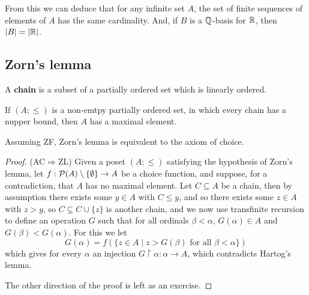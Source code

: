 \documentclass{article}
\begin{document}
From this we can deduce that for any infinite set $A$, the set of finite sequences of elements of $A$ has the same cardinality. And, if $B$ is a $\mathbb{Q}$-basis for $\mathbb{R}$, then $\left| B \right|=\left| \mathbb{R} \right|$.

\subsection{Zorn's lemma}

\begin{definition}
    A \textbf{chain} is a subset of a partially ordered set which is linearly ordered.
\end{definition}

\begin{axiom}
    If $(A;\leq)$ is a non-emtpy partially ordered set, in which every chain has a nupper bound, then $A$ has a maximal element.
\end{axiom}

\begin{theorem}
    Assuming ZF, Zorn's lemma is equivalent to the axiom of choice.
    \begin{proof}
        (AC$\Rightarrow$ZL) Given a poset $(A;\leq)$ satisfying the hypothesis of Zorn's lemma, let $f:\mathcal{P}(A)\setminus\{\emptyset\}\rightarrow A$ be a choice function, and suppose, for a contradiction, that $A$ has no maximal element. Let $C\subseteq A$ be a chain, then by assumption there exists some $y\in A$ with $C\leq y$, and so there exists some $z\in A$ with $z>y$, so $C\subsetneq C\cup \{z\}$ is another chain, and we now use transfinite recursion to define an operation $G$ such that for all ordinals $\beta < \alpha$, $G(\alpha)\in A$ and $G(\beta) < G(\alpha)$. For this we let \[
        G(\alpha) = f(\{z\in A \mid z > G(\beta) \text{ for all }\beta < \alpha\})
        \] which gives for every $\alpha$ an injection $G\restriction \alpha:\alpha\rightarrow A$, which contradicts Hartog's lemma.

        The other direction of the proof is left as an exercise.
    \end{proof}
\end{theorem}
\end{document}
